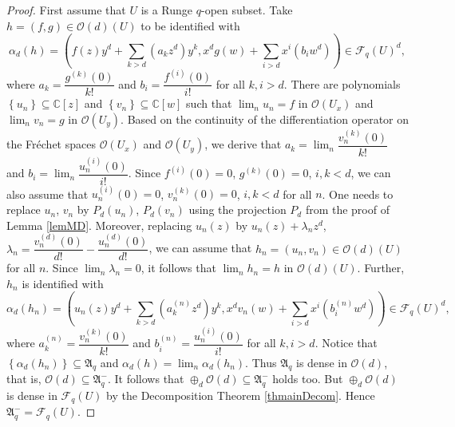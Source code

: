 \documentclass[12pt,reqno]{amsart}%
\theoremstyle{plain}
\numberwithin{theorem}{section} \numberwithin{equation}{section}
\numberwithin{lemma}{section}
\numberwithin{remark}{section}
\numberwithin{example}{section}
\numberwithin{proposition}{section}
\numberwithin{definition}{section}
\numberwithin{corollary}{section}
\begin{document}
\begin{proof}
First assume that $U$ is a Runge $q$-open subset. Take $h=\left(  f,g\right)
\in\mathcal{O}\left(  d\right)  \left(  U\right)  $ to be identified with
\[
\alpha_{d}\left(  h\right)  =\left(  f\left(  z\right)  y^{d}+\sum
_{k>d}\left(  a_{k}z^{d}\right)  y^{k},x^{d}g\left(  w\right)  +\sum
_{i>d}x^{i}\left(  b_{i}w^{d}\right)  \right)  \in\mathcal{F}_{q}\left(
U\right)  ^{d},
\]
where $a_{k}=\dfrac{g^{\left(  k\right)  }\left(  0\right)  }{k!}$ and
$b_{i}=\dfrac{f^{\left(  i\right)  }\left(  0\right)  }{i!}$ for all $k,i>d$.
There are polynomials $\left\{  u_{n}\right\}  \subseteq\mathbb{C}\left[
z\right]  $ and $\left\{  v_{n}\right\}  \subseteq\mathbb{C}\left[  w\right]
$ such that $\lim_{n}u_{n}=f$ in $\mathcal{O}\left(  U_{x}\right)  $ and
$\lim_{n}v_{n}=g$ in $\mathcal{O}\left(  U_{y}\right)  $. Based on the
continuity of the differentiation operator on the Fr\'{e}chet spaces
$\mathcal{O}\left(  U_{x}\right)  $ and $\mathcal{O}\left(  U_{y}\right)  $,
we derive that $a_{k}=\lim_{n}\dfrac{v_{n}^{\left(  k\right)  }\left(
0\right)  }{k!}$ and $b_{i}=\lim_{n}\dfrac{u_{n}^{\left(  i\right)  }\left(
0\right)  }{i!}$. Since $f^{\left(  i\right)  }\left(  0\right)  =0$,
$g^{\left(  k\right)  }\left(  0\right)  =0$, $i,k<d$, we can also assume that
$u_{n}^{\left(  i\right)  }\left(  0\right)  =0$, $v_{n}^{\left(  k\right)
}\left(  0\right)  =0$, $i,k<d$ for all $n$. One needs to replace $u_{n}$,
$v_{n}$ by $P_{d}\left(  u_{n}\right)  $, $P_{d}\left(  v_{n}\right)  $ using
the projection $P_{d}$ from the proof of Lemma \ref{lemMD}. Moreover,
replacing $u_{n}\left(  z\right)  $ by $u_{n}\left(  z\right)  +\lambda
_{n}z^{d}$, $\lambda_{n}=\dfrac{v_{n}^{\left(  d\right)  }\left(  0\right)
}{d!}-\dfrac{u_{n}^{\left(  d\right)  }\left(  0\right)  }{d!}$, we can assume
that $h_{n}=\left(  u_{n},v_{n}\right)  \in\mathcal{O}\left(  d\right)
\left(  U\right)  $ for all $n$. Since $\lim_{n}\lambda_{n}=0$, it follows
that $\lim_{n}h_{n}=h$ in $\mathcal{O}\left(  d\right)  \left(  U\right)  $.
Further, $h_{n}$ is identified with
\[
\alpha_{d}\left(  h_{n}\right)  =\left(  u_{n}\left(  z\right)  y^{d}%
+\sum_{k>d}\left(  a_{k}^{\left(  n\right)  }z^{d}\right)  y^{k},x^{d}%
v_{n}\left(  w\right)  +\sum_{i>d}x^{i}\left(  b_{i}^{\left(  n\right)  }%
w^{d}\right)  \right)  \in\mathcal{F}_{q}\left(  U\right)  ^{d},
\]
where $a_{k}^{\left(  n\right)  }=\dfrac{v_{n}^{\left(  k\right)  }\left(
0\right)  }{k!}$ and $b_{i}^{\left(  n\right)  }=\dfrac{u_{n}^{\left(
i\right)  }\left(  0\right)  }{i!}$ for all $k,i>d$. Notice that $\left\{
\alpha_{d}\left(  h_{n}\right)  \right\}  \subseteq\mathfrak{A}_{q}$ and
$\alpha_{d}\left(  h\right)  =\lim_{n}\alpha_{d}\left(  h_{n}\right)  $. Thus
$\mathfrak{A}_{q}$ is dense in $\mathcal{O}\left(  d\right)  $, that is,
$\mathcal{O}\left(  d\right)  \subseteq\mathfrak{A}_{q}^{-}$. It follows that
$\oplus_{d}\mathcal{O}\left(  d\right)  \subseteq\mathfrak{A}_{q}^{-}$ holds
too. But $\oplus_{d}\mathcal{O}\left(  d\right)  $ is dense in $\mathcal{F}%
_{q}\left(  U\right)  $ by the Decomposition Theorem \ref{thmainDecom}. Hence
$\mathfrak{A}_{q}^{-}=\mathcal{F}_{q}\left(  U\right)  $.


\end{proof}
\end{document}
